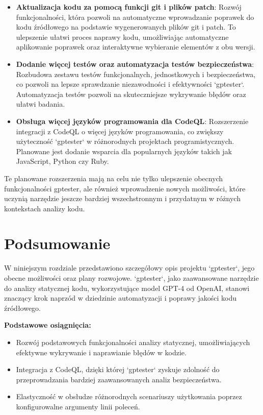 \begin{itemize}
    \item \textbf{Aktualizacja kodu za pomocą funkcji git i plików patch}: Rozwój funkcjonalności, która pozwoli na automatyczne wprowadzanie poprawek do kodu źródłowego na podstawie wygenerowanych plików git i patch. To ulepszenie ułatwi proces naprawy kodu, umożliwiając automatyczne aplikowanie poprawek oraz interaktywne wybieranie elementów z obu wersji.
    \item \textbf{Dodanie więcej testów oraz automatyzacja testów bezpieczeństwa}: Rozbudowa zestawu testów funkcjonalnych, jednostkowych i bezpieczeństwa, co pozwoli na lepsze sprawdzanie niezawodności i efektywności `gptester`. Automatyzacja testów pozwoli na skuteczniejsze wykrywanie błędów oraz ułatwi badania.
    \item \textbf{Obsługa więcej języków programowania dla CodeQL}: Rozszerzenie integracji z CodeQL o więcej języków programowania, co zwiększy użyteczność `gptester` w różnorodnych projektach programistycznych. Planowane jest dodanie wsparcia dla popularnych języków takich jak JavaScript, Python czy Ruby.
\end{itemize}

Te planowane rozszerzenia mają na celu nie tylko ulepszenie obecnych funkcjonalności gptester, ale również wprowadzenie nowych możliwości, które uczynią narzędzie jeszcze bardziej wszechstronnym i przydatnym w różnych kontekstach analizy kodu.
\section{Podsumowanie}
\label{sec:podsumowanie}

W niniejszym rozdziale przedstawiono szczegółowy opis projektu `gptester`, jego obecne możliwości oraz plany rozwojowe. `gptester`, jako zaawansowane narzędzie do analizy statycznej kodu, wykorzystujące model GPT-4 od OpenAI, stanowi znaczący krok naprzód w dziedzinie automatyzacji i poprawy jakości kodu źródłowego.

\textbf{Podstawowe osiągnięcia:}
\begin{itemize}
    \item Rozwój podstawowych funkcjonalności analizy statycznej, umożliwiających efektywne wykrywanie i naprawianie błędów w kodzie.
    \item Integracja z CodeQL, dzięki której `gptester` zyskuje zdolność do przeprowadzania bardziej zaawansowanych analiz bezpieczeństwa.
    \item Elastyczność w obsłudze różnorodnych scenariuszy użytkowania poprzez konfigurowalne argumenty linii poleceń.
\end{itemize}

